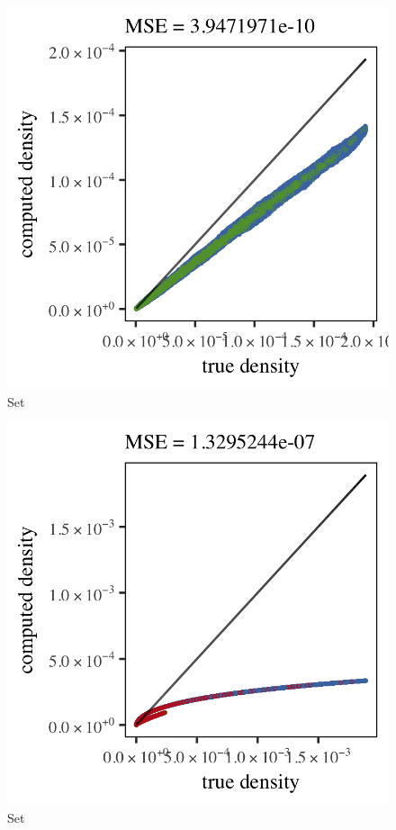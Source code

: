 
\begin{subfigure}{0.3\textwidth}
	\centering
	\includegraphics[keepaspectratio=true, width=\textwidth, height=0.23\textheight]{4/img/results_ferdosi_1_600000_parzen}
	\caption{Set \ferdosiOne}
	\label{fig:4:simulated:datasets:parzen:ferdosi1}
\end{subfigure}
\begin{subfigure}{0.3\textwidth}
	\centering
	\includegraphics[keepaspectratio=true, width=\textwidth, height=0.23\textheight]{4/img/results_ferdosi_2_600000_parzen}
	\caption{Set \ferdosiTwo}
	\label{fig:4:simulated:datasets:parzen:ferdosi2}
\end{subfigure}	

